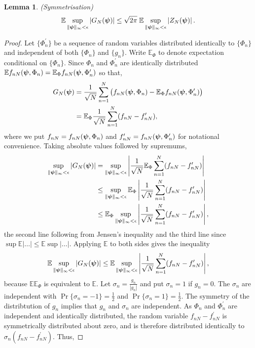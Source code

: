 \documentclass[aap]{imsart}
\newcommand{\prob}{\operatorname{Pr}}
\newcommand{\expect}{{\mathbb E}}
\newcommand{\abs}[1]{\left\vert #1 \right\vert}
\newtheorem{lemma}{Lemma}
\begin{document}
\begin{lemma} \label{lem:symmetrisation}(Symmetrisation)
\[
\expect \sup_{\|\psibf\|_{\infty} < \epsilon} \abs{ G_N(\psibf)} \leq \sqrt{2\pi} \; \expect \sup_{\|\psibf\|_{\infty} < \epsilon}  \abs{ Z_N(\psibf) }.
\]
\end{lemma}
\begin{proof}
Let $\{\Phi_n^\prime\}$ be a sequence of random variables distributed identically to $\{\Phi_n\}$ and independent of both $\{\Phi_n\}$ and $\{g_n\}$.  Write $\expect_\Phi$ to denote expectation conditional on $\{\Phi_n\}$.  %
Since $\Phi_n$ and $\Phi_n^\prime$ are identically distributed $\expect f_{nN}(\psibf, \Phi_n) = \expect_\Phi f_{nN}(\psibf, \Phi_n^\prime)$ so that,
\begin{align*}
G_N(\psibf) &= \frac{1}{\sqrt{N}} \sum_{n=1}^{N} \big( f_{nN}(\psibf, \Phi_n) - \expect_\Phi f_{nN}(\psibf, \Phi_n^\prime) \big)  \\
&= \expect_\Phi \frac{1}{\sqrt{N}} \sum_{n=1}^{N} ( f_{nN} - f_{nN}^\prime ),
\end{align*}
where we put $f_{nN} = f_{nN}(\boldsymbol{\psi}, \Phi_n)$ and  $f_{nN}^\prime = f_{nN}(\boldsymbol{\psi}, \Phi_n^\prime)$  for notational convenience.
Taking absolute values followed by supremums,
\begin{align}
 \sup_{\|\psibf\|_{\infty} < \epsilon} \abs{ G_N(\psibf)} &= \sup_{\|\psibf\|_{\infty} < \epsilon}  \abs{\frac{1}{\sqrt{N}} \expect_\Phi \sum_{n=1}^{N} (f_{nN} - f_{nN}^\prime )} \nonumber \\
&\leq \sup_{\|\psibf\|_{\infty} < \epsilon} \expect_\Phi  \abs{ \frac{1}{\sqrt{N}} \sum_{n=1}^{N}  (f_{nN} - f_{nN}^\prime) } \nonumber  \\
&\leq \expect_\Phi \sup_{\|\psibf\|_{\infty} < \epsilon} \abs{ \frac{1}{\sqrt{N}}\sum_{n=1}^{N} ( f_{nN} - f_{nN}^\prime ) }, \label{eq:Eoutsidesup}
\end{align}
the second line following from Jensen's inequality and the third line since $\sup \expect \abs{\dots} \leq \expect \sup \abs{\dots}$.  Applying $\expect$ to both sides gives the inequality
\begin{equation}\label{eq:Gninequfin}
 \expect \sup_{\|\psibf\|_{\infty} < \epsilon} \abs{ G_N(\psibf)} \leq  \expect \sup_{\|\psibf\|_{\infty} < \epsilon} \abs{ \frac{1}{\sqrt{N}}\sum_{n=1}^{N}  (f_{nN} - f_{nN}^\prime) },
\end{equation}
because $\expect \expect_\Phi$ is equivalent to $\expect$.   Let $\sigma_n = \frac{g_n}{\abs{g_n}}$ and put $\sigma_n = 1$ if $g_n = 0$.  The $\sigma_n$ are independent with $\prob\{ \sigma_n = -1 \} = \tfrac{1}{2}$ and $\prob\{ \sigma_n = 1 \} = \tfrac{1}{2}$.  The symmetry of the distribtution of $g_n$ implies that $g_n$ and $\sigma_n$ are independent. As $\Phi_n$ and $\Phi_n^\prime$ are independent and identically distributed, the random variable $f_{nN} - f_{nN}^\prime$ is symmetrically distributed about zero, and is therefore distributed identically to $\sigma_n( f_{nN} - f_{nN}^\prime)$.  Thus,

\end{proof}
\end{document}
